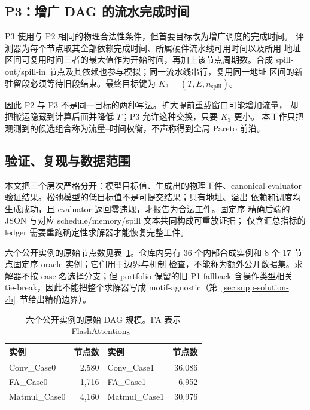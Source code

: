 \subsection{P3：增广 DAG 的流水完成时间}

P3 使用与 P2 相同的物理合法性条件，但首要目标改为增广调度的完成时间。
评测器为每个节点取其全部依赖完成时间、所属硬件流水线可用时间以及所用
地址区间可复用时间三者的最大值作为开始时间，再加上该节点周期数。合成
spill-out/spill-in 节点及其依赖也参与模拟；同一流水线串行，复用同一地址
区间的新驻留段必须等待旧段结束。最终目标键为
$K_3=(T,E,n_{\mathrm{spill}})$。

因此 P2 与 P3 不是同一目标的两种写法。扩大提前重载窗口可能增加流量，
却把搬运隐藏到计算后面并降低 $T$；P3 允许这种交换，只要 $K_3$ 更小。
本工作只把观测到的候选组合称为流量--时间权衡，不声称得到全局 Pareto
前沿。

\subsection{验证、复现与数据范围}

本文把三个层次严格分开：模型目标值、生成出的物理工件、canonical
evaluator 验证结果。松弛模型的低目标值不是可提交结果；只有地址、溢出
依赖和调度均生成成功，且 evaluator 返回零违规，才报告为合法工件。固定序
精确后端的 JSON 与对应 schedule/memory/spill 文本共同构成可重放证据；
仅含汇总指标的 ledger 需要重跑确定性求解器才能恢复完整工件。

六个公开实例的原始节点数见表~\ref{tab:supp-public-size-zh}。仓库内另有
36 个内部合成实例和 8 个 17 节点固定序 oracle 实例；它们用于边界与机制
检查，不能称为额外公开数据集。求解器不按 case 名选择分支；但 portfolio
保留的旧 P1 fallback 含操作类型相关 tie-break，因此不能把整个求解器写成
motif-agnostic（第~\ref{sec:supp-solution-zh}~节给出精确边界）。

\begin{table}[H]
\centering
\caption{六个公开实例的原始 DAG 规模。FA 表示 FlashAttention。}
\label{tab:supp-public-size-zh}
\begin{tabular}{@{}lrlr@{}}
\toprule
实例 & 节点数 & 实例 & 节点数\\
\midrule
Conv\_Case0 & 2,580 & Conv\_Case1 & 36,086\\
FA\_Case0 & 1,716 & FA\_Case1 & 6,952\\
Matmul\_Case0 & 4,160 & Matmul\_Case1 & 30,976\\
\bottomrule
\end{tabular}
\end{table}
